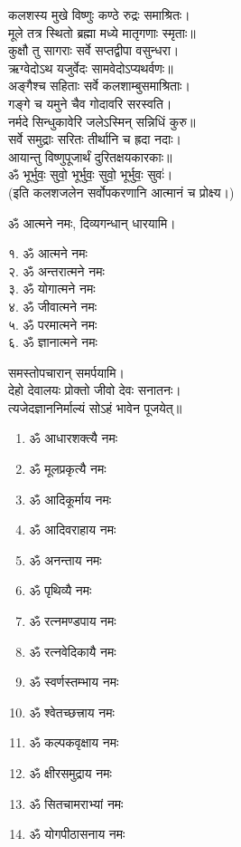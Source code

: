 कलशस्य मुखे विष्णुः कण्ठे रुद्रः समाश्रितः।\\
मूले तत्र स्थितो ब्रह्मा मध्ये मातृगणाः स्मृताः॥\\
कुक्षौ तु सागराः सर्वे सप्तद्वीपा वसुन्धरा।\\
ऋग्वेदोऽथ यजुर्वेदः सामवेदोऽप्यथर्वणः॥\\
अङ्गैश्च सहिताः सर्वे कलशाम्बुसमाश्रिताः।\\
गङ्गे च यमुने चैव गोदावरि सरस्वति।\\
नर्मदे सिन्धुकावेरि जलेऽस्मिन् सन्निधिं कुरु॥\\
सर्वे समुद्राः सरितः तीर्थानि च ह्रदा नदाः।\\
आयान्तु विष्णुपूजार्थं दुरितक्षयकारकाः॥\\
ॐ भूर्भुवः॒ सुवो॒ भूर्भुवः॒ सुवो॒ भूर्भुवः॒ सुवः॑।\\

(इति कलशजलेन सर्वोपकरणानि आत्मानं च प्रोक्ष्य।)

ॐ आत्मने नमः, दिव्यगन्धान् धारयामि।
\begin{multicols}{2}
१. ॐ आत्मने नमः\\
२. ॐ अन्तरात्मने नमः\\
३. ॐ योगात्मने नमः\\
४. ॐ जीवात्मने नमः\\
५. ॐ परमात्मने नमः\\
६. ॐ ज्ञानात्मने नमः
\end{multicols}
समस्तोपचारान् समर्पयामि।\\

देहो देवालयः प्रोक्तो जीवो देवः सनातनः।\\
त्यजेदज्ञाननिर्माल्यं सोऽहं भावेन पूजयेत्॥\\

\begin{multicols}{2}
\begin{enumerate}
\item ॐ आधारशक्त्यै नमः
\item ॐ मूलप्रकृत्यै नमः
\item ॐ आदिकूर्माय नमः 
\item ॐ आदिवराहाय नमः
\item ॐ अनन्ताय नमः
\item ॐ पृथिव्यै नमः
\item ॐ रत्नमण्डपाय नमः
\item ॐ रत्नवेदिकायै नमः
\item ॐ स्वर्णस्तम्भाय नमः
\item ॐ श्वेतच्छत्त्राय नमः
\item ॐ कल्पकवृक्षाय नमः
\item ॐ क्षीरसमुद्राय नमः 
\item ॐ सितचामराभ्यां नमः
\item ॐ योगपीठासनाय नमः
\end{enumerate}
\end{multicols}
 
